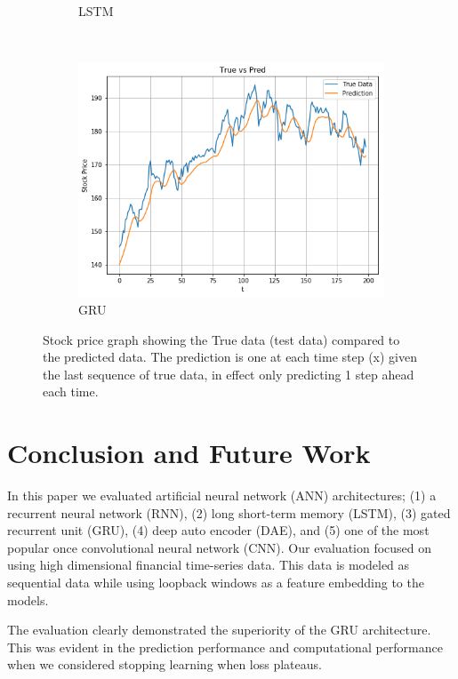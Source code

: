 \documentclass[11pt]{article}
\begin{document}
\begin{figure}
\begin{subfigure}[b]{0.3\textwidth}
        \caption{LSTM}
        \label{fig:result-lstm}
    \end{subfigure}
    ~ %
    \begin{subfigure}[b]{0.3\textwidth}
        \includegraphics[width=\textwidth]{media/result-gru}
        \caption{GRU}
        \label{fig:result-gru}
    \end{subfigure}
    \caption{Stock price graph showing the True data (test data) compared to the predicted data. The prediction is one at each time step (x) given the last sequence of true data, in effect only predicting 1 step ahead each time.
}\label{fig:stock-performance-architecture}
\end{figure}

\section{Conclusion and Future Work} \label{sec:conclusion}

In this paper we evaluated artificial neural network (ANN) architectures; (1) a recurrent neural network (RNN), (2) long short-term memory (LSTM), (3) gated recurrent unit (GRU), (4) deep auto encoder (DAE), and (5) one of the most popular once convolutional neural network (CNN). Our evaluation focused on using high dimensional financial time-series data. This data is modeled as sequential data while using loopback windows as a feature embedding to the models.

The evaluation clearly demonstrated the superiority of the GRU architecture. This was evident in the prediction performance and computational performance when we considered stopping learning when loss plateaus.
\end{document}
